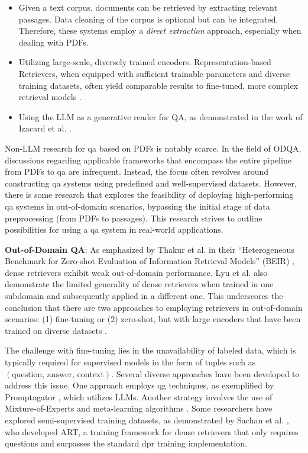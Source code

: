 \begin{itemize}
    \item Given a text corpus, documents can be retrieved by extracting relevant passages. Data cleaning of the corpus is optional but can be integrated. Therefore, these systems employ a \textit{direct extraction} approach, especially when dealing with PDFs.
    \item Utilizing large-scale, diversely trained encoders. Representation-based Retrievers, when equipped with sufficient trainable parameters and diverse training datasets, often yield comparable results to fine-tuned, more complex retrieval models \cite{ni_large_2021,neelakantan_text_2022}.
    \item Using the LLM as a generative reader for QA, as demonstrated in the work of Izacard et al. \cite{izacard_leveraging_2021}.
\end{itemize}

Non-LLM research for \gls{qa} based on PDFs is notably scarce. In the field of ODQA, discussions regarding applicable frameworks that encompass the entire pipeline from PDFs to \gls{qa} are infrequent. Instead, the focus often revolves around constructing \gls{qa} systems using predefined and well-supervised datasets. However, there is some research that explores the feasibility of deploying high-performing \gls{qa} systems in out-of-domain scenarios, bypassing the initial stage of data preprocessing (from PDFs to passages). This research strives to outline possibilities for using a \gls{qa} system in real-world applications.

\noindent \textbf{Out-of-Domain QA}: As emphasized by Thakur et al. in their \enquote{Heterogeneous Benchmark for Zero-shot Evaluation of Information Retrieval Models} (BEIR) \cite{thakur_beir_2021}, dense retrievers exhibit weak out-of-domain performance. Lyu et al. \cite{farea_evaluation_2022} also demonstrate the limited generality of dense retrievers when trained in one subdomain and subsequently applied in a different one. This underscores the conclusion that there are two approaches to employing retrievers in out-of-domain scenarios: (1) fine-tuning or (2) zero-shot, but with large encoders that have been trained on diverse datasets \cite{ni_large_2021}.

The challenge with fine-tuning lies in the unavailability of labeled data, which is typically required for supervised models in the form of tuples such as $(\text{question, answer, context})$. Several diverse approaches have been developed to address this issue. One approach employs \gls{qg} techniques, as exemplified by Promptagator \cite{dai_promptagator_2022}, which utilizes LLMs. Another strategy involves the use of Mixture-of-Experts and meta-learning algorithms \cite{chen_improving_2021}. Some researchers have explored semi-supervised training datasets, as demonstrated by Sachan et al. \cite{sachan_questions_2023}, who developed ART, a training framework for dense retrievers that only requires questions and surpasses the standard \gls{dpr} training implementation.

